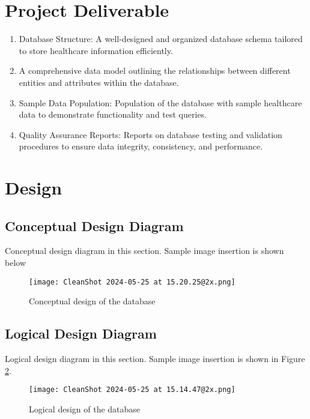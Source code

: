 \documentclass[11pt]{article}
\begin{document}
\section{Project Deliverable}
\begin{enumerate}
    \item Database Structure: A well-designed and organized database schema tailored to store healthcare information efficiently.
    \item A comprehensive data model outlining the relationships between different entities and attributes within the database.
    \item Sample Data Population: Population of the database with sample healthcare data to demonstrate functionality and test queries.
    \item Quality Assurance Reports: Reports on database testing and validation procedures to ensure data integrity, consistency, and performance.
\end{enumerate} 





\section{Design}


\subsection{Conceptual Design Diagram}
Conceptual design diagram in this section. Sample image insertion is shown below

\begin{figure}[H]
    \centering
    \texttt{[image: CleanShot 2024-05-25 at 15.20.25@2x.png]}
    \caption{Conceptual design of the database}
    \label{fig:1}
\end{figure}

\subsection{Logical Design Diagram}
Logical design diagram in this section. Sample image insertion is shown in Figure \ref{fig:2}.

\begin{figure}[H]
    \centering
    \texttt{[image: CleanShot 2024-05-25 at 15.14.47@2x.png]}
    \caption{Logical design of the database}
    \label{fig:2}
\end{figure}
\end{document}
